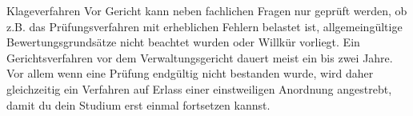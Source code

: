 \begin{artikel}{Klageverfahren}
Vor Gericht kann neben fachlichen Fragen nur geprüft werden, ob z.B. das Prüfungsverfahren mit erheblichen Fehlern belastet ist, allgemeingültige Bewertungsgrundsätze nicht beachtet wurden oder Willkür vorliegt. Ein Gerichtsverfahren vor dem Verwaltungsgericht dauert meist ein bis zwei Jahre. Vor allem wenn eine Prüfung endgültig nicht bestanden wurde, wird daher gleichzeitig ein Verfahren auf Erlass einer einstweiligen Anordnung angestrebt, damit du dein Studium erst einmal fortsetzen kannst.
\end{artikel}
